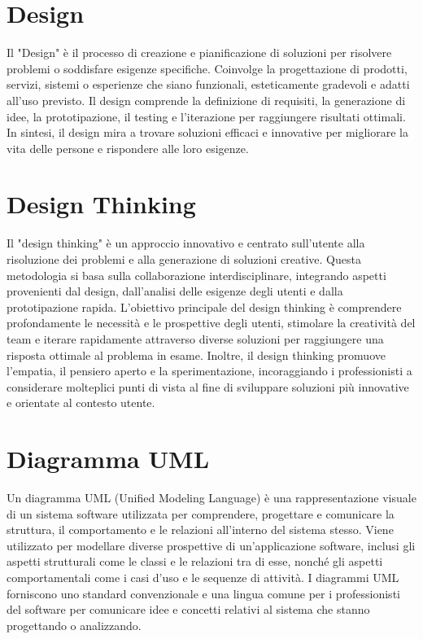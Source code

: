 \documentclass{article}
\begin{document}
\section{Design}
Il "Design" è il processo di creazione e pianificazione di soluzioni per risolvere problemi o soddisfare esigenze specifiche. Coinvolge la progettazione di prodotti, servizi, sistemi o esperienze che siano funzionali, esteticamente gradevoli e adatti all'uso previsto. Il design comprende la definizione di requisiti, la generazione di idee, la prototipazione, il testing e l'iterazione per raggiungere risultati ottimali. In sintesi, il design mira a trovare soluzioni efficaci e innovative per migliorare la vita delle persone e rispondere alle loro esigenze.

\section{Design Thinking}
Il "design thinking" è un approccio innovativo e centrato sull'utente alla risoluzione dei problemi e alla generazione di soluzioni creative. Questa metodologia si basa sulla collaborazione interdisciplinare, integrando aspetti provenienti dal design, dall'analisi delle esigenze degli utenti e dalla prototipazione rapida. L'obiettivo principale del design thinking è comprendere profondamente le necessità e le prospettive degli utenti, stimolare la creatività del team e iterare rapidamente attraverso diverse soluzioni per raggiungere una risposta ottimale al problema in esame. Inoltre, il design thinking promuove l'empatia, il pensiero aperto e la sperimentazione, incoraggiando i professionisti a considerare molteplici punti di vista al fine di sviluppare soluzioni più innovative e orientate al contesto utente.

\section{Diagramma UML}
Un diagramma UML (Unified Modeling Language) è una rappresentazione visuale di un sistema software utilizzata per comprendere, progettare e comunicare la struttura, il comportamento e le relazioni all'interno del sistema stesso. Viene utilizzato per modellare diverse prospettive di un'applicazione software, inclusi gli aspetti strutturali come le classi e le relazioni tra di esse, nonché gli aspetti comportamentali come i casi d'uso e le sequenze di attività. I diagrammi UML forniscono uno standard convenzionale e una lingua comune per i professionisti del software per comunicare idee e concetti relativi al sistema che stanno progettando o analizzando.
\end{document}

